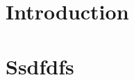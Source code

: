 \documentclass[a4paper]{article}
\theoremstyle{example-style}
\begin{document}


 

\section{Introduction}

\section{Ssdfdfs}
\end{document}
